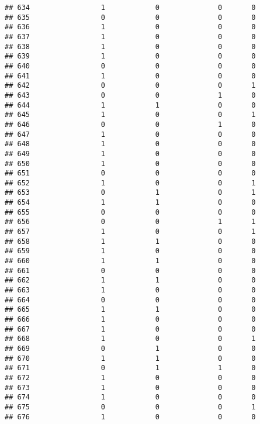 \documentclass[]{article}
\begin{document}
\begin{verbatim}
## 634                 1            0              0       0
## 635                 0            0              0       0
## 636                 1            0              0       0
## 637                 1            0              0       0
## 638                 1            0              0       0
## 639                 1            0              0       0
## 640                 0            0              0       0
## 641                 1            0              0       0
## 642                 0            0              0       1
## 643                 0            0              1       0
## 644                 1            1              0       0
## 645                 1            0              0       1
## 646                 0            0              1       0
## 647                 1            0              0       0
## 648                 1            0              0       0
## 649                 1            0              0       0
## 650                 1            0              0       0
## 651                 0            0              0       0
## 652                 1            0              0       1
## 653                 0            1              0       1
## 654                 1            1              0       0
## 655                 0            0              0       0
## 656                 0            0              1       1
## 657                 1            0              0       1
## 658                 1            1              0       0
## 659                 1            0              0       0
## 660                 1            1              0       0
## 661                 0            0              0       0
## 662                 1            1              0       0
## 663                 1            0              0       0
## 664                 0            0              0       0
## 665                 1            1              0       0
## 666                 1            0              0       0
## 667                 1            0              0       0
## 668                 1            0              0       1
## 669                 0            1              0       0
## 670                 1            1              0       0
## 671                 0            1              1       0
## 672                 1            0              0       0
## 673                 1            0              0       0
## 674                 1            0              0       0
## 675                 0            0              0       1
## 676                 1            0              0       0

\end{verbatim}
\end{document}
